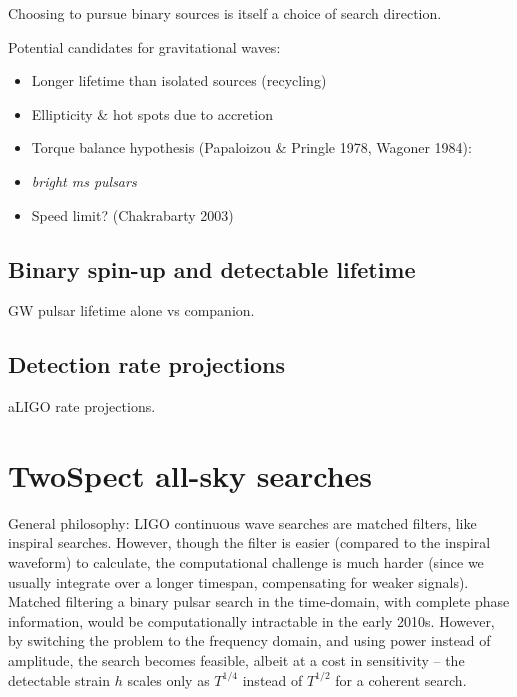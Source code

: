 Choosing to pursue binary sources is itself a choice of search direction.

Potential candidates for gravitational waves:
\begin{itemize}
\item Longer lifetime than isolated sources (recycling)
\item Ellipticity \& hot spots due to accretion
\item Torque balance hypothesis (Papaloizou \& Pringle 1978, Wagoner 1984):
\item \emph{bright ms pulsars}
\item Speed limit? (Chakrabarty 2003)
\end{itemize}




            \subsection{Binary spin-up and detectable lifetime}
            \label{spin-up}
         
                GW pulsar lifetime alone vs companion.

            \subsection{Detection rate projections}
            \label{rate_projections}

                aLIGO rate projections.

        \section{TwoSpect all-sky searches}
        \label{all-sky}

        General philosophy: LIGO continuous wave searches are matched filters, like inspiral searches. However, though the filter is easier (compared to the inspiral waveform) to calculate, the computational challenge is much harder (since we usually integrate over a longer timespan, compensating for weaker signals). Matched filtering a binary pulsar search in the time-domain, with complete phase information, would be computationally intractable in the early 2010s. However, by switching the problem to the frequency domain, and using power instead of amplitude, the search becomes feasible, albeit at a cost in sensitivity -- the detectable strain $h$ scales only as $T^{1/4}$ instead of $T^{1/2}$ for a coherent search.

